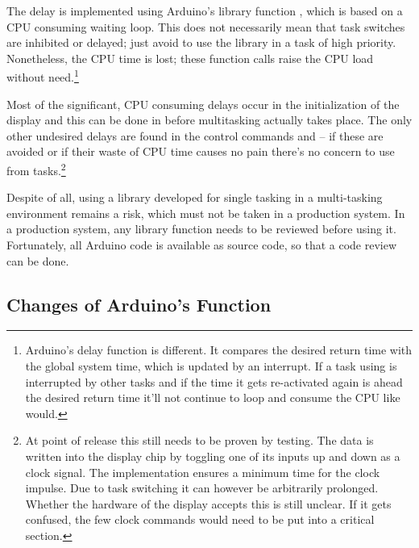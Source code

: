 The delay is implemented using Arduino's library function
, which is based on a CPU consuming waiting loop.
This does not necessarily mean that task switches are inhibited or
delayed; just avoid to use the library in a task of high priority.
Nonetheless, the CPU time is lost; these function calls raise the CPU load
without need.\footnote{Arduino's delay function 
is different. It compares the desired return time with the
global system time, which is updated by an interrupt. If a task using
 is interrupted by other tasks and if the time it gets
re-activated again is ahead the desired return time it'll not continue to
loop and consume the CPU like  would.}

Most of the significant, CPU consuming delays occur in the initialization
of the display and this can be done in  before multitasking
actually takes place. The only other undesired delays are found in the
control commands  and  -- if these are avoided or
if their waste of CPU time causes no pain there's no concern to use
 from \rtos{} tasks.\footnote{At point of release
this still needs to be proven by testing. The data is written into the
display chip by toggling one of its inputs up and down as a clock signal.
The implementation ensures a minimum time for the clock impulse. Due to
task switching it can however be arbitrarily prolonged. Whether the
hardware of the display accepts this is still unclear. If it gets
confused, the few clock commands would need to be put into a critical
section.}

Despite of all, using a library developed for single tasking in a
multi-tasking environment remains a risk, which must not be taken in a
production system. In a production system, any library function needs to
be reviewed before using it. Fortunately, all Arduino code is available as
source code, so that a code review can be done.


\subsection{Changes of Arduino's  Function}

